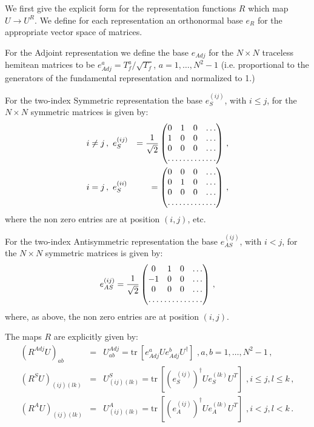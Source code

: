 \documentclass{article}[12pt]
\begin{document}
We first give the explicit form for the representation functions $R$ which map 
$U\rightarrow U^R$. We define for each representation an orthonormal base $e_R$ for 
the appropriate vector space of matrices. 

For the Adjoint representation we define the base $e_{Adj}$ for the $N\times N$ 
traceless hemitean matrices to be $e_{Adj}^a=T^a_f/\sqrt{T_f}$, $a=1,\dots,N^2-1$ 
(i.e. proportional to the generators of the fundamental representation and 
normalized to 1.)

For the two-index Symmetric representation the base $e^{(ij)}_{S}$, with $i\le j$, for 
the $N\times N$ symmetric matrices is given by:
\begin{eqnarray}
i\neq j \, ,\,\,\,&e^{(ij)}_S&=\frac{1}{\sqrt{2}}\begin{pmatrix} 
0&1&0&\dots\\
1&0&0&\dots\\
0&0&0&\dots\\
\hdotsfor{4}
\end{pmatrix}\, , \\
i=j \, ,\,\,\,&e^{(ii)}_S&=\begin{pmatrix} 
0&0&0&\dots\\
0&1&0&\dots\\
0&0&0&\dots\\
\hdotsfor{4}
\end{pmatrix}\, , 
\end{eqnarray}
where the non zero entries are at position $(i,j)$, etc.

For the two-index Antisymmetric representation the base $e^{(ij)}_{AS}$, with $i<j$, for 
the $N\times N$ symmetric matrices is given by:
\begin{equation}
e^{(ij)}_{AS}=\frac{1}{\sqrt{2}}\begin{pmatrix} 
0&1&0&\dots\\
-1&0&0&\dots\\
0&0&0&\dots\\
\hdotsfor{4}
\end{pmatrix}\, , 
\end{equation}
where, as above, the non zero entries are at position $(i,j)$.

The maps $R$ are explicitly given by:
\begin{eqnarray}
(R^{Adj} U)_{ab} &=& U^{Adj}_{ab} = \mathrm{tr\ }\left[ e^a_{Adj} U e^b_{Adj} U^\dagger\right]\,\, , a,b=1,\dots,N^2-1\, ,\\ 
(R^{S} U)_{(ij)(lk)} &=& U^{S}_{(ij)(lk)} = \mathrm{tr\ }\left[ (e^{(ij)}_{S})^\dagger U e^{(lk)}_S U^T\right]\,\, , i\le j, l\le k\, ,\\ 
(R^{A} U)_{(ij)(lk)} &=& U^{A}_{(ij)(lk)} = \mathrm{tr\ }\left[ (e^{(ij)}_{A})^\dagger U e^{(lk)}_A U^T\right]\,\, , i< j, l< k\, .
\end{eqnarray}
\end{document}
